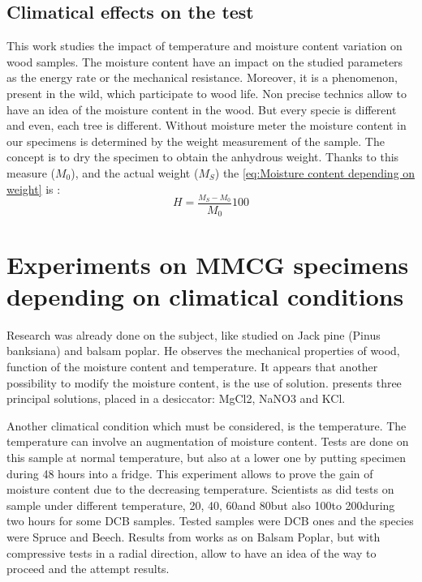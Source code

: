 
\subsection{Climatical effects on the test}


This work studies the impact of temperature and moisture content variation on wood samples. The moisture content have an impact on the studied parameters as the energy rate or the mechanical resistance. Moreover, it is a phenomenon, present in the wild, which participate to wood life. Non precise technics allow to have an idea of the moisture content in the wood. But every specie is different and even, each tree is different. 
Without moisture meter the moisture content in our specimens is determined by the weight measurement of the sample. The concept is to dry the specimen to obtain the anhydrous weight. Thanks to this measure ($M_{0}$), and the actual weight ($M_{S}$) the \ref{eq:Moisture content depending on weight} is :
\begin{equation}
	H=\frac{_{M_{S}-M_{0}}}{M_{0}}100
	\label{eq:Moisture content depending on weight}
\end{equation} 


\section{Experiments on MMCG specimens depending on climatical conditions}

Research was already done on the subject, like \parencite{Reference12} studied on Jack pine (Pinus banksiana) and balsam poplar. He observes the mechanical properties of wood, function of the moisture content and temperature. It appears that another possibility to modify the moisture content, is the use of solution. \parencite{Reference12} presents three principal solutions, placed in a desiccator: MgCl2, NaNO3 and KCl. 

Another climatical condition which must be considered, is the temperature. The temperature can involve an augmentation of moisture content. Tests are done on this sample at normal temperature, but also at a lower one by putting specimen during 48 hours into a fridge. This experiment allows to prove the gain of moisture content due to the decreasing temperature. Scientists as \parencite{Reference13} did tests on sample under different temperature, 20\textcelsius, 40\textcelsius, 60\textcelsius and 80\textcelsius but also 100\textcelsius to 200\textcelsius during two hours for some DCB samples.
Tested samples were DCB ones and the species were Spruce and Beech. Results from works as \parencite{Reference12} on Balsam Poplar, but with compressive tests in a radial direction, allow to have an idea of the way to proceed and the attempt results. 

